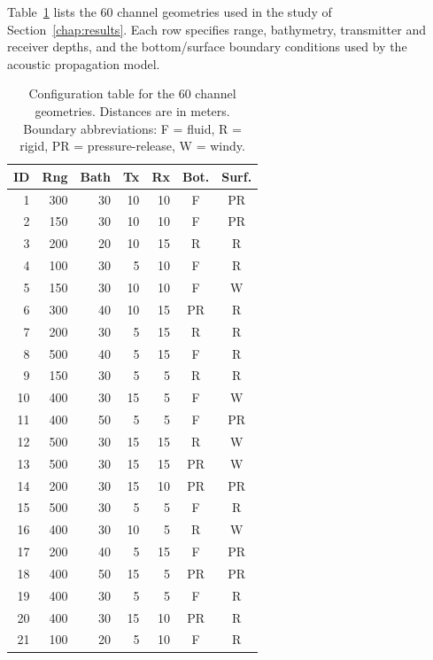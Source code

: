 \documentclass{wileysev}
\begin{document}
	Table~\ref{tab:cohort} lists the 60 channel geometries used in the study of Section~\ref{chap:results}. Each row specifies range, bathymetry, transmitter and receiver depths, and the bottom/surface boundary conditions used by the acoustic propagation model.
	
	\begin{table}[H]
		\centering
		\scriptsize
		\setlength{\tabcolsep}{2.0pt}
		\renewcommand{\arraystretch}{0.92}
		\caption{Configuration table for the 60 channel geometries. Distances are in meters. Boundary abbreviations: F = fluid, R = rigid, PR = pressure-release, W = windy.}
		\label{tab:cohort}
		\begin{minipage}[t]{0.49\textwidth}
			\vspace{0pt}
			\centering
			\begin{tabular}{@{}rrrrrcc@{}}
				\toprule
				ID & Rng & Bath & Tx & Rx & Bot. & Surf. \\
				\midrule
				1 & 300 & 30 & 10 & 10 & F & PR \\
				2 & 150 & 30 & 10 & 10 & F & PR \\
				3 & 200 & 20 & 10 & 15 & R & R \\
				4 & 100 & 30 & 5 & 10 & F & R \\
				5 & 150 & 30 & 10 & 10 & F & W \\
				6 & 300 & 40 & 10 & 15 & PR & R \\
				7 & 200 & 30 & 5 & 15 & R & R \\
				8 & 500 & 40 & 5 & 15 & F & R \\
				9 & 150 & 30 & 5 & 5 & R & R \\
				10 & 400 & 30 & 15 & 5 & F & W \\
				11 & 400 & 50 & 5 & 5 & F & PR \\
				12 & 500 & 30 & 15 & 15 & R & W \\
				13 & 500 & 30 & 15 & 15 & PR & W \\
				14 & 200 & 30 & 15 & 10 & PR & PR \\
				15 & 500 & 30 & 5 & 5 & F & R \\
				16 & 400 & 30 & 10 & 5 & R & W \\
				17 & 200 & 40 & 5 & 15 & F & PR \\
				18 & 400 & 50 & 15 & 5 & PR & PR \\
				19 & 400 & 30 & 5 & 5 & F & R \\
				20 & 400 & 30 & 15 & 10 & PR & R \\
				21 & 100 & 20 & 5 & 10 & F & R \\

\end{tabular}
\end{minipage}
\end{table}
\end{document}
